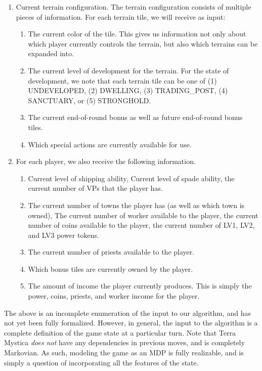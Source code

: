 \documentclass[12pt,twocolumn,letterpaper]{article}
\begin{document}
\begin{enumerate}
    \item Current terrain configuration. The terrain configuration consists of multiple pieces of information. For each terrain tile, we will receive as input:
    \begin{enumerate}
        \item The current color of the tile. This gives us information not only about which player currently controls the terrain, but also which terrains can be expanded into.
        \item The current level of development for the terrain. For the state of development, we note that each terrain tile can be one of (1) UNDEVELOPED, (2) DWELLING, (3) TRADING\_POST, (4) SANCTUARY, or (5) STRONGHOLD.
        \item The current end-of-round bonus as well as future end-of-round bonus tiles.
        \item Which special actions are currently available for use.
    \end{enumerate}
    \item For each player, we also receive the following information.
    \begin{enumerate}
        \item Current level of shipping ability, Current level of spade ability, the current number of VPs that the player has.
        \item The current number of towns the player has (as well as which town is owned), The current number of worker available to the player, the current number of coins available to the player, the current number of LV1, LV2, and LV3 power tokens.
        \item The current number of priests available to the player.
        \item Which bonus tiles are currently owned by the player.
        \item The amount of income the player currently produces. This is simply the power, coins, priests, and worker income for the player.
    \end{enumerate}
\end{enumerate}

The above is an incomplete enumeration of the input to our algorithm, and has not yet been fully formalized. However, in general, the input to the algorithm is a complete definition of the game state at a particular turn. Note that Terra Mystica \textit{does not} have any dependencies in previous moves, and is completely Markovian. As such, modeling the game as an MDP is fully realizable, and is simply a question of incorporating all the features of the state.
\end{document}
